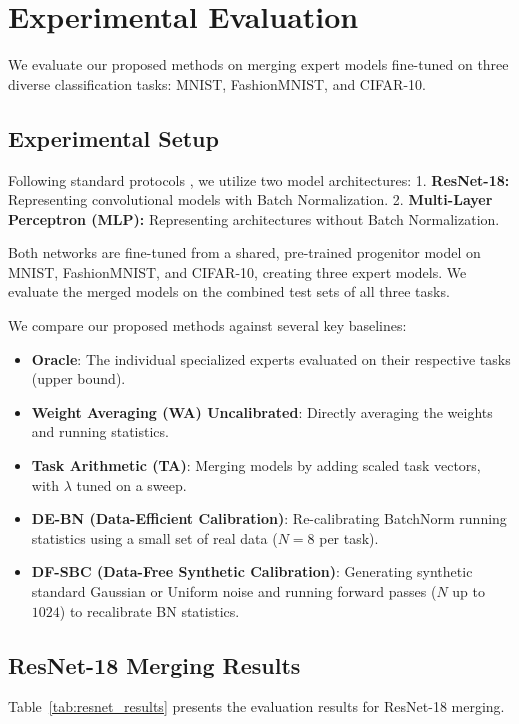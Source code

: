 \documentclass{article}
\theoremstyle{plain}
\theoremstyle{definition}
\theoremstyle{remark}
\begin{document}
\section{Experimental Evaluation}
\label{sec:experiments}

We evaluate our proposed methods on merging expert models fine-tuned on three diverse classification tasks: MNIST, FashionMNIST, and CIFAR-10.

\subsection{Experimental Setup}

Following standard protocols \cite{methodologist_deconstruction}, we utilize two model architectures:
1. \textbf{ResNet-18:} Representing convolutional models with Batch Normalization.
2. \textbf{Multi-Layer Perceptron (MLP):} Representing architectures without Batch Normalization.

Both networks are fine-tuned from a shared, pre-trained progenitor model on MNIST, FashionMNIST, and CIFAR-10, creating three expert models. We evaluate the merged models on the combined test sets of all three tasks. 

We compare our proposed methods against several key baselines:
\begin{itemize}
    \item \textbf{Oracle}: The individual specialized experts evaluated on their respective tasks (upper bound).
    \item \textbf{Weight Averaging (WA) Uncalibrated}: Directly averaging the weights and running statistics.
    \item \textbf{Task Arithmetic (TA)}: Merging models by adding scaled task vectors, with $\lambda$ tuned on a sweep.
    \item \textbf{DE-BN (Data-Efficient Calibration)}: Re-calibrating BatchNorm running statistics using a small set of real data ($N=8$ per task).
    \item \textbf{DF-SBC (Data-Free Synthetic Calibration)}: Generating synthetic standard Gaussian or Uniform noise and running forward passes ($N$ up to $1024$) to recalibrate BN statistics.
\end{itemize}

\subsection{ResNet-18 Merging Results}

Table~\ref{tab:resnet_results} presents the evaluation results for ResNet-18 merging.
\end{document}
